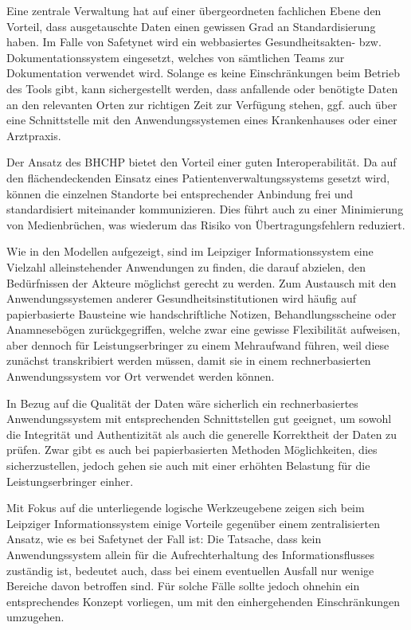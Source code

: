 Eine zentrale Verwaltung hat auf einer übergeordneten fachlichen Ebene den Vorteil, dass ausgetauschte Daten einen gewissen Grad an Standardisierung haben. Im Falle von Safetynet wird ein webbasiertes Gesundheitsakten- bzw. Dokumentationssystem eingesetzt, welches von sämtlichen Teams zur Dokumentation verwendet wird. Solange es keine Einschränkungen beim Betrieb des Tools gibt, kann sichergestellt werden, dass anfallende oder benötigte Daten an den relevanten Orten zur richtigen Zeit zur Verfügung stehen, ggf. auch über eine Schnittstelle mit den Anwendungssystemen eines Krankenhauses oder einer Arztpraxis.

Der Ansatz des BHCHP bietet den Vorteil einer guten Interoperabilität. Da auf den flächendeckenden Einsatz eines Patientenverwaltungssystems gesetzt wird, können die einzelnen Standorte bei entsprechender Anbindung frei und standardisiert miteinander kommunizieren. Dies führt auch zu einer Minimierung von Medienbrüchen, was wiederum das Risiko von Übertragungsfehlern reduziert.

Wie in den Modellen aufgezeigt, sind im Leipziger Informationssystem eine Vielzahl alleinstehender Anwendungen zu finden, die darauf abzielen, den Bedürfnissen der Akteure möglichst gerecht zu werden. Zum Austausch mit den Anwendungssystemen anderer Gesundheitsinstitutionen wird häufig auf papierbasierte Bausteine wie handschriftliche Notizen, Behandlungsscheine oder Anamnesebögen zurückgegriffen, welche zwar eine gewisse Flexibilität aufweisen, aber dennoch für Leistungserbringer zu einem Mehraufwand führen, weil diese zunächst transkribiert werden müssen, damit sie in einem rechnerbasierten Anwendungssystem vor Ort verwendet werden können.

In Bezug auf die Qualität der Daten wäre sicherlich ein rechnerbasiertes Anwendungssystem mit entsprechenden Schnittstellen gut geeignet, um sowohl die Integrität und Authentizität als auch die generelle Korrektheit der Daten zu prüfen. Zwar gibt es auch bei papierbasierten Methoden Möglichkeiten, dies sicherzustellen, jedoch gehen sie auch mit einer erhöhten Belastung für die Leistungserbringer einher.

Mit Fokus auf die unterliegende logische Werkzeugebene zeigen sich beim Leipziger Informationssystem einige Vorteile gegenüber einem zentralisierten Ansatz, wie es bei Safetynet der Fall ist: Die Tatsache, dass kein Anwendungssystem allein für die Aufrechterhaltung des Informationsflusses zuständig ist, bedeutet auch, dass bei einem eventuellen Ausfall nur wenige Bereiche davon betroffen sind. Für solche Fälle sollte jedoch ohnehin ein entsprechendes Konzept vorliegen, um mit den einhergehenden Einschränkungen umzugehen.

